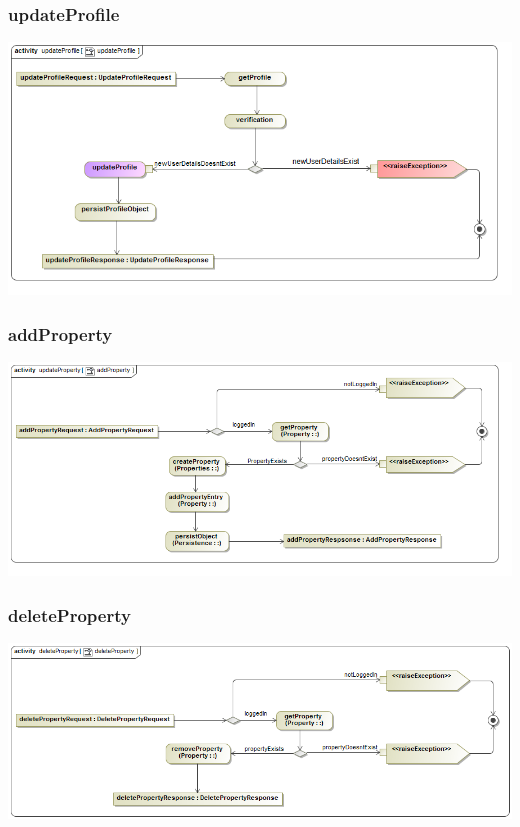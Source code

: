 \documentclass[a4paper,12pt]{article}
\begin{document}
\subsubsection{updateProfile}
\includegraphics[width=1\textwidth]{./Images/newDiagrams/processSpecification/Diana/updateProfile.png}

\subsubsection{addProperty}
\includegraphics[width=1\textwidth]{./Images/processSpecification/addProperty.png}
\subsubsection{deleteProperty}
\includegraphics[width=1\textwidth]{./Images/processSpecification/deleteProperty.png}
\end{document}
